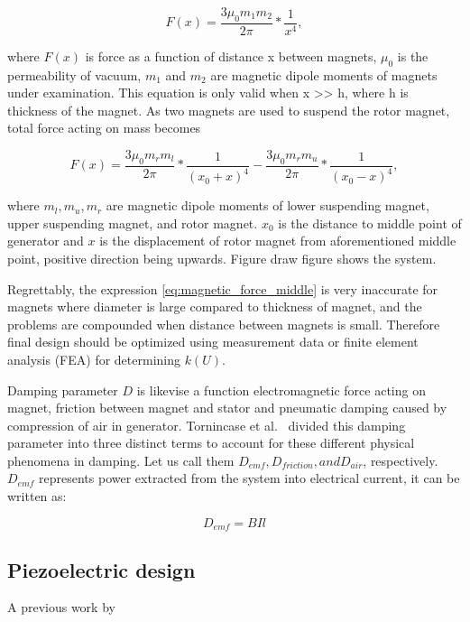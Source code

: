 \begin{equation}\label{eq:magnetic_force}
  F(x) = \frac{3 \mu_0 m_1 m_2}{2 \pi} * \frac{1}{x^4},
\end{equation}

where $F(x)$ is force as a function of distance x between magnets, $\mu_0$ is the permeability of vacuum, $ m_1 $ and $ m_2 $ are magnetic dipole moments of magnets under examination. This equation is only valid when x >> h, where h is thickness of the magnet. As two magnets are used to suspend the rotor magnet, total force acting on mass becomes 

\begin{equation}\label{eq:magnetic_force_middle}
  F(x) = \frac{3 \mu_0 m_r m_l}{2 \pi} * \frac{1}{(x_0+x)^4} - \frac{3 \mu_0 m_r m_u}{2 \pi} * \frac{1}{(x_0-x)^4},
\end{equation}

where $m_l, m_u, m_r$ are magnetic dipole moments of lower suspending magnet, upper suspending magnet, and rotor magnet. $x_0$ is the distance to middle point of generator and $x$ is the displacement of rotor magnet from aforementioned middle point, positive direction being upwards. Figure {\color{red}draw figure} shows the system.

Regrettably, the expression \eqref{eq:magnetic_force_middle} is very inaccurate for magnets where diameter is large compared to thickness of magnet, and the problems are compounded when distance between magnets is small. Therefore final design should be optimized using measurement data or finite element analysis (FEA) for determining $k(U)$. 

Damping parameter $D$ is likevise a function electromagnetic force acting on magnet, friction between magnet and stator and pneumatic damping caused by compression of air in generator. Tornincase et al. \cite{Tornincasa2012} divided this damping parameter into three distinct terms to account for these different physical phenomena in damping. Let us call them $D_{emf}, D_{friction}, and D_{air}$, respectively. $D_{emf}$ represents power extracted from the system into electrical current, it can be written as:

\begin{equation}\label{eq:emf_force_middle}
  D_{emf} = BIl
\end{equation}

\subsection{Piezoelectric design}
A previous work by 

